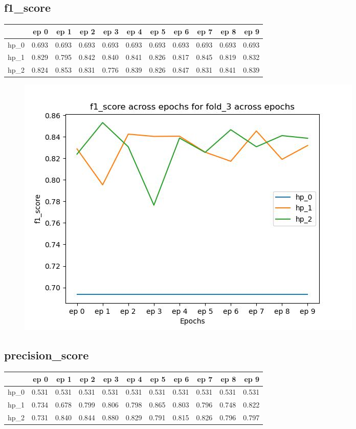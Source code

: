 \documentclass{article}
\begin{document}
\subsection{f1\_score}
\begin{tabular}{lrrrrrrrrrr}
\toprule
{} &   ep 0 &   ep 1 &   ep 2 &   ep 3 &   ep 4 &   ep 5 &   ep 6 &   ep 7 &   ep 8 &   ep 9 \\
\midrule
hp\_0 &  0.693 &  0.693 &  0.693 &  0.693 &  0.693 &  0.693 &  0.693 &  0.693 &  0.693 &  0.693 \\
hp\_1 &  0.829 &  0.795 &  0.842 &  0.840 &  0.841 &  0.826 &  0.817 &  0.845 &  0.819 &  0.832 \\
hp\_2 &  0.824 &  0.853 &  0.831 &  0.776 &  0.839 &  0.826 &  0.847 &  0.831 &  0.841 &  0.839 \\
\bottomrule
\end{tabular}

\begin{figure}[H]
\includegraphics[scale = 0.75]{fold_3/f1_score}
\end{figure}
\subsection{precision\_score}
\begin{tabular}{lrrrrrrrrrr}
\toprule
{} &   ep 0 &   ep 1 &   ep 2 &   ep 3 &   ep 4 &   ep 5 &   ep 6 &   ep 7 &   ep 8 &   ep 9 \\
\midrule
hp\_0 &  0.531 &  0.531 &  0.531 &  0.531 &  0.531 &  0.531 &  0.531 &  0.531 &  0.531 &  0.531 \\
hp\_1 &  0.734 &  0.678 &  0.799 &  0.806 &  0.798 &  0.865 &  0.803 &  0.796 &  0.748 &  0.822 \\
hp\_2 &  0.731 &  0.840 &  0.844 &  0.880 &  0.829 &  0.791 &  0.815 &  0.826 &  0.796 &  0.797 \\
\bottomrule
\end{tabular}
\end{document}
